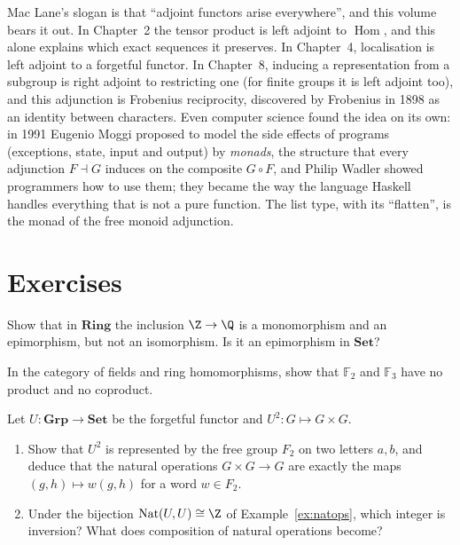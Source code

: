 \begin{beauty}
Mac Lane's slogan is that ``adjoint functors arise everywhere'', and this volume bears it out. In Chapter~2 the tensor product is left adjoint to $\operatorname{Hom}$, and this alone explains which exact sequences it preserves.
In Chapter~4, localisation is left adjoint to a forgetful functor. In Chapter~8, inducing a representation from a subgroup is right adjoint to restricting one (for finite groups it is left adjoint too), and this adjunction is Frobenius reciprocity, discovered by
Frobenius in 1898 as an identity between characters. Even computer science found the idea on its own: in 1991 Eugenio Moggi proposed to model the side effects of programs (exceptions, state, input and output) by
\emph{monads}, the structure that every adjunction $F\dashv G$ induces on the composite $G\circ F$, and Philip Wadler showed programmers how to use them; they became the way the language Haskell handles everything that is not a pure function.
The list type, with its ``flatten'', is the monad of the free monoid adjunction.
\end{beauty}

\section{Exercises}

\begin{exercise}[$\star$]\label{ex:zq}
Show that in $\mathbf{Ring}$ the inclusion $\Z\to\Q$ is a monomorphism and an epimorphism, but not an isomorphism. Is it an epimorphism in $\mathbf{Set}$?
\end{exercise}

\begin{exercise}[$\star$]\label{ex:nofieldproduct}
In the category of fields and ring homomorphisms, show that $\mathbb F_2$ and $\mathbb F_3$ have no product and no coproduct.
\end{exercise}

\begin{exercise}[$\star\star$]\label{ex:words}
Let $U\colon\mathbf{Grp}\to\mathbf{Set}$ be the forgetful functor and $U^2\colon G\mapsto G\times G$.
\begin{enumerate}[label=(\alph*)]
\item Show that $U^2$ is represented by the free group $F_2$ on two letters $a,b$, and deduce that the natural operations $G\times G\to G$ are exactly the maps $(g,h)\mapsto w(g,h)$ for a word $w\in F_2$.
\item Under the bijection $\operatorname{Nat}(U,U)\cong\Z$ of Example~\ref{ex:natops}, which integer is inversion? What does composition of natural operations become?
\end{enumerate}
\end{exercise}

